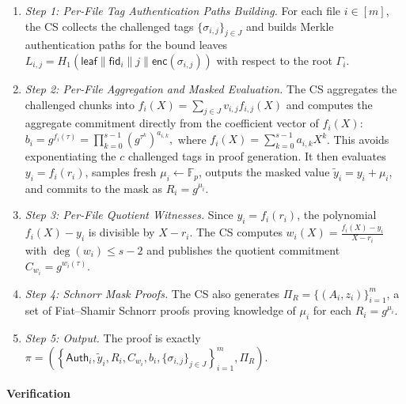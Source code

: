 \documentclass[lettersize,journal]{IEEEtran}
\newcommand{\FF}{\mathbb{F}}
\begin{document}
\begin{enumerate}
    \item \textit{Step 1: Per-File Tag Authentication Paths Building.} For each file $i \in [m]$, the CS collects the challenged tags $\{\sigma_{i,j}\}_{j\in J}$ and builds Merkle authentication paths for the bound leaves $L_{i,j}=H_1(\mathsf{leaf}\|\mathsf{fid}_i\|j\|\mathsf{enc}(\sigma_{i,j}))$ with respect to the root $\Gamma_i$.
    \item \textit{Step 2: Per-File Aggregation and Masked Evaluation.} The CS aggregates the challenged chunks into
    $
    f_i(X)=\sum_{j\in J} v_{i,j}f_{i,j}(X)
    $
    and computes the aggregate commitment directly from the coefficient vector of $f_i(X)$:
    $
    b_i=g^{f_i(\tau)}=\prod_{k=0}^{s-1}(g^{\tau^k})^{a_{i,k}},
    $
    where $f_i(X)=\sum_{k=0}^{s-1}a_{i,k}X^k$. This avoids exponentiating the $c$ challenged tags in proof generation. 
    It then evaluates $y_i=f_i(r_i)$, samples fresh $\mu_i\leftarrow\FF_p$, outputs the masked value $\tilde{y}_i=y_i+\mu_i$, and commits to the mask as $R_i=g^{\mu_i}$.
    \item \textit{Step 3: Per-File Quotient Witnesses.} Since $y_i=f_i(r_i)$, the polynomial $f_i(X)-y_i$ is divisible by $X-r_i$. The CS computes
    $
    w_i(X)=\frac{f_i(X)-y_i}{X-r_i}
    $
    with $\deg(w_i)\le s-2$ and publishes the quotient commitment $C_{w_i}=g^{w_i(\tau)}$. 
    \item \textit{Step 4: Schnorr Mask Proofs.} The CS also generates $\Pi_R=\{(A_i,z_i)\}_{i=1}^m$, a set of Fiat--Shamir Schnorr proofs proving knowledge of $\mu_i$ for each $R_i=g^{\mu_i}$. 
    \item \textit{Step 5: Output.} The proof is exactly
    $
    \pi=\left(\left\{\mathsf{Auth}_i,\tilde{y}_i,R_i,C_{w_i},b_i,\{\sigma_{i,j}\}_{j\in J}\right\}_{i=1}^m,\Pi_R\right).
    $
\end{enumerate}


\paragraph{\textbf{Verification}}
\end{document}

